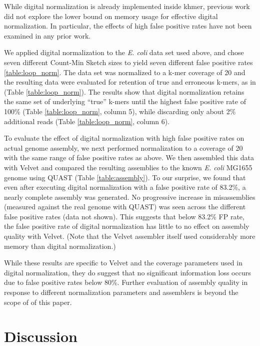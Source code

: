 While digital normalization is already implemented inside khmer,
previous work did not explore the lower bound on memory usage for
effective digital normalization.  In particular, the effects of high
false positive rates have not been examined in any prior work.

We applied digital normalization to the {\em E. coli} data set used
above, and chose seven different Count-Min Sketch sizes to yield seven
different false positive rates \ref{table:loop_norm}.  The data set
was normalized to a k-mer coverage of 20 and the resulting data were
evaluated for retention of true and erroneous k-mers, as in
\cite{Brown2012} (Table \ref{table:loop_norm}).  The results show that
digital normalization retains the same set of underlying ``true''
k-mers until the highest false positive rate of 100\% (Table
\ref{table:loop_norm}, column 5), while discarding only about 2\%
additional reads (Table \ref{table:loop_norm}, column 6).

To evaluate the effect of digital normalization with high false
positive rates on actual genome assembly, we next performed
normalization to a coverage of 20 with the same range of false
positive rates as above.  We then assembled this data with Velvet
\cite{Zerbino2008} and compared the resulting assemblies to the known
     {\em E. coli} MG1655 genome using QUAST (Table
     \ref{table:assembly}).  To our surprise, we found that even after
     executing digital normalization with a false positive rate of
     83.2\%, a nearly complete assembly was generated.  No progressive
     increase in misassemblies (measured against the real genome with
     QUAST) was seen across the different false positive rates (data
     not shown). This suggests that below 83.2\% FP rate, the false
     positive rate of digital normalization has little to no effect on
     assembly quality with Velvet.  (Note that the Velvet assembler
     itself used considerably more memory than digital normalization.)


While these results are specific to Velvet and the coverage parameters
used in digital normalization, they do suggest that no significant
information loss occurs due to false positive rates below 80\%.
Further evaluation of assembly quality in response to different
normalization parameters and assemblers is beyond the scope of of this
paper.

\section{Discussion}


